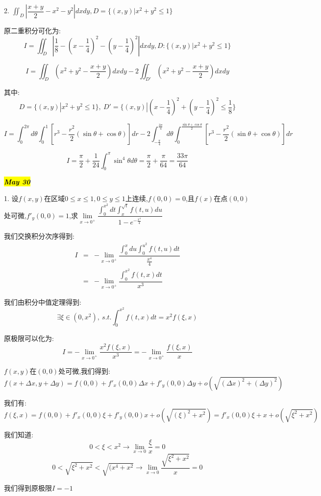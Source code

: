 2. $\iint_{D}|\dfrac{x+y}{2}-x^2-y^2|dxdy,D=\{(x,y)|x^2+y^2\leq 1\}$
\begin{solution}
	
	原二重积分可化为: 
	$$I=\iint_{D}|\dfrac{1}{8}-(x-\dfrac{1}{4})^2-(y-\dfrac{1}{4})^2|dxdy,D:\{(x,y)|x^2+y^2\leq 1\}$$
	
	$$I=\iint_{D}(x^2+y^2-\dfrac{x+y}{2})dxdy-2\iint_{D'}(x^2+y^2-\dfrac{x+y}{2})dxdy$$
	
	其中: $$D=\{(x,y)|x^2+y^2\leq 1\},\ D'=\{(x,y)|(x-\frac{1}{4})^2+(y-\frac{1}{4})^2\leq \frac{1}{8}\}$$
	
	$$I=\int_{0}^{2\pi}d\theta\int_{0}^{1}[r^3-\frac{r^2}{2}(\sin\theta+\cos\theta)]dr-2\int_{-\frac{\pi}{4}}^{\frac{3\pi}{4}}d\theta\int_{0}^{\frac{\sin\theta+\cos\theta}{2}}[r^3-\frac{r^2}{2}(\sin\theta+\cos\theta)]dr$$
	
	$$I=\frac{\pi}{2}+\frac{1}{24}\int_{0}^{\pi}\sin^4\theta d\theta=\frac{\pi}{2}+\frac{\pi}{64}=\frac{33\pi}{64}$$
\end{solution}

\hl{\textbf{\textit{May 30}}}

1. 设$f(x,y)$在区域$0\leq x\leq 1,0\leq y\leq 1$上连续,$f(0,0)=0$,且$f(x)$在点$(0,0)$处可微,$f'_{y}(0,0)=1$,求$\lim\limits_{x\rightarrow 0^{+}}\dfrac{\int_{0}^{x^2}dt\int_{x}^{\sqrt{t}}f(t,u)du}{1-e^{-\frac{x^4}{4}}}$
\begin{solution}
	
	我们交换积分次序得到: 
	\begin{eqnarray*}
		I&=&-\lim\limits_{x\rightarrow 0^{+}}\dfrac{\int_{0}^{x}du\int_{0}^{u^2}f(t,u)dt}{\frac{x^4}{4}}\\
		&=&-\lim\limits_{x\rightarrow 0^{+}}\dfrac{\int_{0}^{x^2}f(t,x)dt}{x^3}
	\end{eqnarray*}
	
	我们由积分中值定理得到: 
	$$\exists \xi\in(0,x^2),\ s.t. \int_{0}^{x^2}f(t,x)dt=x^2f(\xi,x)$$
	
	原极限可以化为: 
	$$I=-\lim\limits_{x\rightarrow 0^{+}}\dfrac{x^2f(\xi,x)}{x^3}=-\lim\limits_{x\rightarrow 0^{+}}\dfrac{f(\xi,x)}{x}$$
	
	$f(x,y)$在$(0,0)$处可微,我们得到: 
	$$f(x+\Delta x,y+\Delta y)=f(0,0)+f'_{x}(0,0)\Delta x+f'_{y}(0,0)\Delta y+o(\sqrt{(\Delta x)^2+(\Delta y)^2})$$
	
	我们有: 
	$$f(\xi,x)=f(0,0)+f'_{x}(0,0)\xi+f'_{y}(0,0)x+o(\sqrt{(\xi)^2+x^2})=f'_{x}(0,0)\xi+x+o(\sqrt{\xi^2+x^2})$$
	
	我们知道: 
	$$0<\xi<x^2\rightarrow \lim\limits_{x\rightarrow 0}\dfrac{\xi}{x}=0$$
	$$0<\sqrt{\xi^2+x^2}<\sqrt{(x^4+x^2}\rightarrow \lim\limits_{x\rightarrow 0}\dfrac{\sqrt{\xi^2+x^2}}{x}=0 $$
	
	我们得到原极限$I=-1$
\end{solution}

